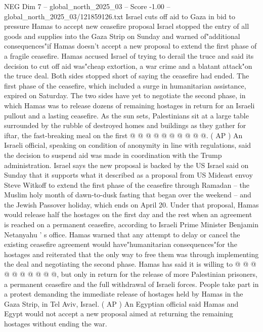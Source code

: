 \begin{textsample}{NEG Dim 7 – global\_north\_2025\_03 – Score -1.00 – global\_north\_2025\_03/121859126.txt}  \label{ex:f7_neg_135}
Israel cuts off aid to Gaza in bid to pressure Hamas to accept new ceasefire proposal Israel stopped the entry of all goods and supplies into the Gaza Strip on Sunday and warned of"additional consequences"if Hamas doesn't accept a new proposal to extend the first phase of a fragile ceasefire.
Hamas accused Israel of trying to derail the truce and said its decision to cut off aid was"cheap extortion, a war crime and a blatant attack"on the truce deal.
Both sides stopped short of saying the ceasefire had ended.
The first phase of the ceasefire, which included a surge in humanitarian assistance, expired on Saturday.
The two sides have yet to negotiate the second phase, in which Hamas was to release dozens of remaining hostages in return for an Israeli pullout and a lasting ceasefire.
As the sun sets, Palestinians sit at a large table surrounded by the rubble of destroyed homes and buildings as they gather for iftar, the fast-breaking meal on the first @ @ @ @ @ @ @ @ @ @. ( AP ) An Israeli official, speaking on condition of anonymity in line with regulations, said the decision to suspend aid was made in coordination with the Trump administration.
Israel says the new proposal is backed by the US Israel said on Sunday that it supports what it described as a proposal from US Mideast envoy Steve Witkoff to extend the first phase of the ceasefire through Ramadan -- the Muslim holy month of dawn-to-dusk fasting that began over the weekend -- and the Jewish Passover holiday, which ends on April 20.
Under that proposal, Hamas would release half the hostages on the first day and the rest when an agreement is reached on a permanent ceasefire, according to Israeli Prime Minister Benjamin Netanyahu ' s office.
Hamas warned that any attempt to delay or cancel the existing ceasefire agreement would have"humanitarian consequences"for the hostages and reiterated that the only way to free them was through implementing the deal and negotiating the second phase.
Hamas has said it is willing to @ @ @ @ @ @ @ @ @ @, but only in return for the release of more Palestinian prisoners, a permanent ceasefire and the full withdrawal of Israeli forces.
People take part in a protest demanding the immediate release of hostages held by Hamas in the Gaza Strip, in Tel Aviv, Israel. ( AP ) An Egyptian official said Hamas and Egypt would not accept a new proposal aimed at returning the remaining hostages without ending the war.

\end{textsample}
